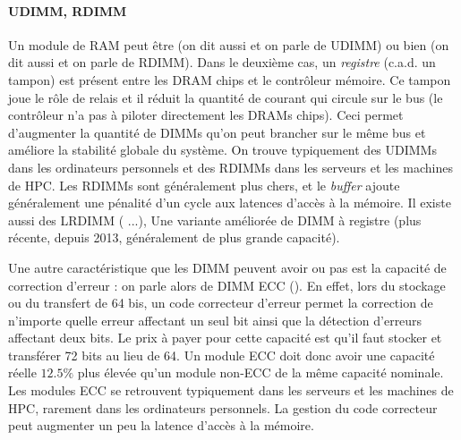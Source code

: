 
\paragraph{UDIMM, RDIMM} Un module de RAM peut être  (on dit
aussi  et on parle de UDIMM) ou bien 
(on dit aussi  et on parle de RDIMM). Dans le deuxième cas, un
\emph{registre} (c.a.d. un tampon) est présent entre les DRAM chips et le
contrôleur mémoire. Ce tampon joue le rôle de relais et il réduit la quantité de
courant qui circule sur le bus (le contrôleur n'a pas à \og piloter\fg
directement les DRAMs chips). Ceci permet d'augmenter la quantité de DIMMs qu'on
peut brancher sur le même bus et améliore la stabilité globale du système. On
trouve typiquement des UDIMMs dans les ordinateurs personnels et des RDIMMs dans
les serveurs et les machines de HPC. Les RDIMMs sont généralement plus chers, et
le \emph{buffer} ajoute généralement une pénalité d'un cycle aux latences
d'accès à la mémoire. Il existe aussi des LRDIMM ( ...),
Une variante améliorée de DIMM à registre (plus récente, depuis 2013,
généralement de plus grande capacité).

Une autre caractéristique que les DIMM peuvent avoir ou pas est la capacité de
correction d'erreur : on parle alors de DIMM ECC (). En effet, lors du stockage ou du transfert de 64 bis, un code
correcteur d'erreur permet la correction de n'importe quelle erreur affectant un
seul bit ainsi que la détection d'erreurs affectant deux bits. Le prix à payer
pour cette capacité est qu'il faut stocker et transférer 72 bits au lieu de
64. Un module ECC doit donc avoir une capacité réelle $12.5\%$ plus élevée qu'un
module non-ECC de la même capacité nominale. Les modules ECC se retrouvent
typiquement dans les serveurs et les machines de HPC, rarement dans les
ordinateurs personnels. La gestion du code correcteur peut augmenter un peu la
latence d'accès à la mémoire.

